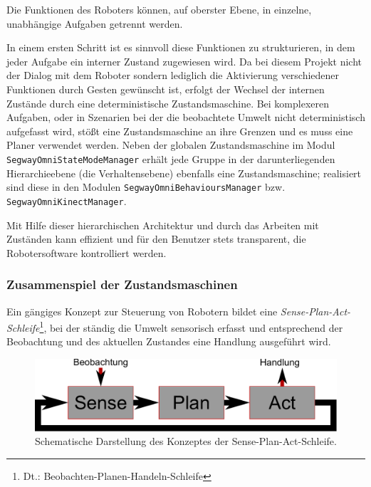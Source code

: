Die Funktionen des Roboters können, auf oberster Ebene, in einzelne, unabhängige Aufgaben getrennt werden. 

In einem ersten Schritt ist es sinnvoll diese Funktionen zu strukturieren, in dem jeder Aufgabe ein 
interner Zustand zugewiesen wird. Da bei diesem Projekt nicht der Dialog mit dem Roboter sondern lediglich 
die Aktivierung verschiedener Funktionen durch Gesten gewünscht ist, erfolgt der Wechsel der internen 
Zustände durch eine deterministische Zustandsmaschine. Bei komplexeren 
Aufgaben, oder in Szenarien bei der die beobachtete Umwelt nicht deterministisch aufgefasst wird, stößt 
eine Zustandsmaschine an ihre Grenzen und es muss eine Planer verwendet werden. 
Neben der globalen Zustandsmaschine im Modul \lstinline{SegwayOmniStateModeManager} erhält jede Gruppe 
in der darunterliegenden Hierarchieebene (die Verhaltensebene) ebenfalls eine Zustandsmaschine; 
realisiert sind diese in den Modulen \lstinline{SegwayOmniBehavioursManager} bzw. \lstinline{SegwayOmniKinectManager}.

Mit Hilfe dieser hierarchischen Architektur und durch das Arbeiten mit Zuständen kann effizient und für 
den Benutzer stets transparent, die Robotersoftware kontrolliert werden.

\subsubsection{Zusammenspiel der Zustandsmaschinen}
\label{integration_umsetzung_zusammenspiel_sec}

Ein gängiges Konzept zur Steuerung von Robotern bildet 
eine \textit{Sense-Plan-Act-Schleife}\footnote{Dt.: Beobachten-Planen-Handeln-Schleife}, bei der 
ständig die Umwelt sensorisch erfasst und entsprechend der Beobachtung und des aktuellen Zustandes 
eine Handlung ausgeführt wird.

\begin{figure}[h]
	\label{fig:integration_sense_plan_act}
	\centering
	\includegraphics[scale=0.5]{graphics/SCHEMA-SensePlanAct.pdf}
	\caption{Schematische Darstellung des Konzeptes der Sense-Plan-Act-Schleife.}
\end{figure}

